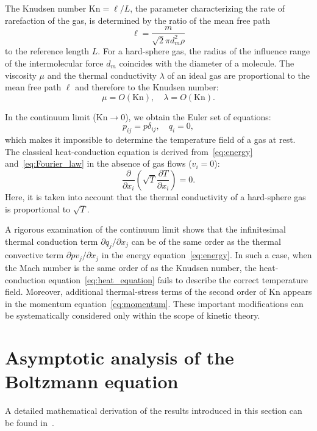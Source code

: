 \documentclass[smallextended, final]{svjour3} %
\newcommand{\Kn}{\mathrm{Kn}}
\newcommand{\pder}[2][]{\frac{\partial#1}{\partial#2}}
\newcommand{\Pder}[2][]{\partial#1/\partial#2}
\begin{document}
The Knudsen number \(\Kn = \ell/L\), the parameter characterizing the rate of rarefaction of the gas,
is determined by the ratio of the mean free path \[ \ell = \frac{m}{\sqrt2\pi d_m^2 \rho} \]
to the reference length \(L\).
For a hard-sphere gas, the radius of the influence range of the intermolecular force \(d_m\)
coincides with the diameter of a molecule.
The viscosity \(\mu\) and the thermal conductivity \(\lambda\) of an ideal gas
are proportional to the mean free path \(\ell\) and therefore to the Knudsen number:
\begin{equation}
    \mu = O(\Kn), \quad \lambda = O(\Kn).
\end{equation}

In the continuum limit (\(\Kn\to0\)), we obtain the Euler set of equations:
\begin{equation}
    p_{ij} = p\delta_{ij}, \quad q_i = 0,
\end{equation}
which makes it impossible to determine the temperature field of a gas at rest.
The classical heat-conduction equation is derived from~\eqref{eq:energy} and~\eqref{eq:Fourier_law}
in the absence of gas flows (\(v_i = 0\)):
\begin{equation}\label{eq:heat_equation}
    \pder{x_i}\left(\sqrt{T}\pder[T]{x_i}\right) = 0.
\end{equation}
Here, it is taken into account that the thermal conductivity of a hard-sphere gas
is proportional to \(\sqrt{T}\).

A rigorous examination of the continuum limit shows that the infinitesimal thermal conduction term \(\Pder[q_j]{x_j}\)
can be of the same order as the thermal convective term \(\Pder[pv_j]{x_j}\) in the energy equation~\eqref{eq:energy}.
In such a case, when the Mach number is the same order of as the Knudsen number,
the heat-conduction equation~\eqref{eq:heat_equation} fails to describe
the correct temperature field. Moreover, additional thermal-stress terms of the second order of \(\Kn\)
appears in the momentum equation~\eqref{eq:momentum}.
These important modifications can be systematically considered only within the scope of kinetic theory.

\section{Asymptotic analysis of the Boltzmann equation}

A detailed mathematical derivation of the results introduced in this section
can be found in~\cite{Sone2002, Sone2007}.
\end{document}
